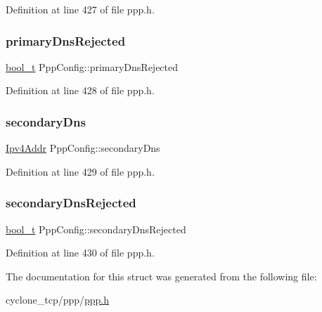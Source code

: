 Definition at line 427 of file ppp.\+h.

\mbox{\label{structPppConfig_aa526bb25849e6e5a08909475f9fa4903}} 
\subsubsection{\texorpdfstring{primary\+Dns\+Rejected}{primaryDnsRejected}}
{\footnotesize\ttfamily \hyperlink{compiler__port_8h_a812d16e5494522586b3784e55d479912}{bool\+\_\+t} Ppp\+Config\+::primary\+Dns\+Rejected}



Definition at line 428 of file ppp.\+h.

\mbox{\label{structPppConfig_ab76ca0298c010c786b8785cd976495a8}} 
\subsubsection{\texorpdfstring{secondary\+Dns}{secondaryDns}}
{\footnotesize\ttfamily \hyperlink{ipv4_8h_a411debb3d770caa0c06d3f73367da37f}{Ipv4\+Addr} Ppp\+Config\+::secondary\+Dns}



Definition at line 429 of file ppp.\+h.

\mbox{\label{structPppConfig_ab2667e0958465df3bed8abf9dcdbff24}} 
\subsubsection{\texorpdfstring{secondary\+Dns\+Rejected}{secondaryDnsRejected}}
{\footnotesize\ttfamily \hyperlink{compiler__port_8h_a812d16e5494522586b3784e55d479912}{bool\+\_\+t} Ppp\+Config\+::secondary\+Dns\+Rejected}



Definition at line 430 of file ppp.\+h.



The documentation for this struct was generated from the following file\+:\begin{DoxyCompactItemize}
\item 
cyclone\+\_\+tcp/ppp/\hyperlink{ppp_8h}{ppp.\+h}\end{DoxyCompactItemize}
